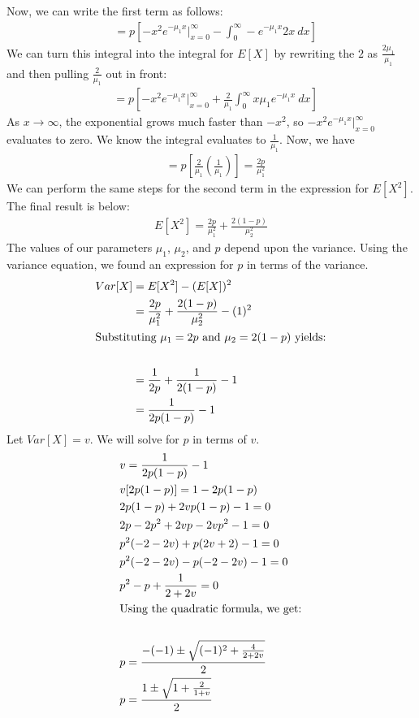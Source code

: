 \documentclass[12pt]{article}
\begin{document}
Now, we can write the first term as follows:
\begin{align*}
&= p[-x^2e^{-\mu_1 x} \biggr\rvert_{x = 0}^{\infty} - \int_{0}^{\infty} -e^{-\mu_1 x} 2x ~ dx]
\end{align*}
We can turn this integral into the integral for $E[X]$ by rewriting the $2$ as $\frac{2\mu_1}{\mu_1}$ and then pulling $\frac{2}{\mu_1}$ out in front:
\begin{align*}
&= p[-x^2e^{-\mu_1 x} \biggr\rvert_{x = 0}^{\infty} + \frac{2}{\mu_1} \int_{0}^{\infty} x \mu_1 e^{-\mu_1 x} ~ dx]
\end{align*}
 As $x \rightarrow \infty$, the exponential grows much faster than $-x^2$, so $-x^2e^{-\mu_1 x} \biggr\rvert_{x = 0}^{\infty}$ evaluates to zero. We know the integral evaluates to $\frac{1}{\mu_1}$. Now, we have
\begin{align*}
&= p[\frac{2}{\mu_1}(\frac{1}{\mu_1})] = \frac{2p}{\mu_1^2}
\end{align*}
We can perform the same steps for the second term in the expression for $E[X^2]$. The final result is below:
\begin{align*}
E[X^2] = \frac{2p}{\mu_1^2} + \frac{2(1-p)}{\mu_2^2}
\end{align*}
The values of our parameters $\mu_1$, $\mu_2$, and $p$ depend upon the variance. Using the variance equation, we found an expression for $p$ in terms of the variance. 
\begin{align*} 
Var[X] &= E[X^2] - (E[X])^2 \\
&= \frac{2p}{\mu_1^2} + \frac{2(1-p)}{\mu_2^2} - (1)^2 \\
\intertext{Substituting $\mu_1 = 2p$ and $\mu_2 = 2(1-p)$ yields:} \\
&= \frac{1}{2p} + \frac{1}{2(1-p)} - 1 \\ 
&= \frac{1}{2p(1-p)} - 1
\end{align*}
Let $Var[X] = v$. We will solve for $p$ in terms of $v$. 
\begin{align*} 
&v = \frac{1}{2p(1-p)} - 1 \\
&v[2p(1-p)] = 1 - 2p(1-p) \\ 
&2p(1-p) + 2vp(1-p) - 1 = 0 \\ 
&2p - 2p^2 + 2vp - 2vp^2 - 1 = 0 \\
&p^2(-2 - 2v) + p(2v + 2) - 1 = 0 \\ 
&p^2(-2 - 2v) - p(-2 - 2v) - 1 = 0 \\ 
&p^2 - p + \frac{1}{2 + 2v} = 0 \\ 
\intertext{Using the quadratic formula, we get:} \\
&p = \frac{-(-1) \pm \sqrt{(-1)^2 + \frac{4}{2+2v}}}{2} \\
&p = \frac{1 \pm \sqrt{1 + \frac{2}{1+v}}}{2}
\end{align*}
\end{document}
